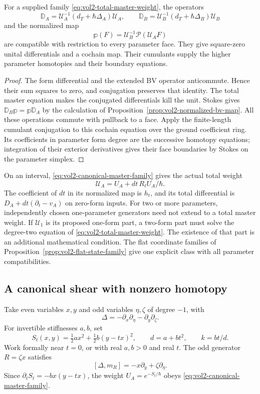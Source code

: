 \begin{proposition}\label{prop:vol2-master-family-faces}
For a supplied family \eqref{eq:vol2-total-master-weight},
the operators
\[
 \mathbb D_A=\mathcal U_A^{-1}(d_T+\hbar\Delta_A)\mathcal U_A,
 \qquad
 \mathbb D_B=\mathcal U_B^{-1}(d_T+\hbar\Delta_B)\mathcal U_B
\]
and the normalized map
\[
 \mathbb p(F)=\mathcal U_B^{-1}\mathcal P(\mathcal U_AF)
\]
are compatible with restriction to every parameter face.
They give square-zero unital differentials and a cochain
map. Their cumulants supply the higher parameter
homotopies and their boundary equations.
\end{proposition}
\begin{proof}
The form differential and the extended BV operator
anticommute. Hence their sum squares to zero, and
conjugation preserves that identity. The total master
equation makes the conjugated differentials kill the unit.
Stokes gives $\mathbb D_B\mathbb p=\mathbb p\mathbb D_A$
by the calculation of
Proposition~\ref{prop:vol2-normalized-bv-map}.
All these operations commute with pullback to a face.
Apply the finite-length cumulant conjugation to this
cochain equation over the ground coefficient ring.
Its coefficients in parameter form degree are the
successive homotopy equations; integration of their
exterior derivatives gives their face boundaries by
Stokes on the parameter simplex.
\end{proof}

On an interval, \eqref{eq:vol2-canonical-master-family}
gives the actual total weight
\[
 \mathcal U_A=U_A+dt\,R_tU_A/\hbar.
\]
The coefficient of $dt$ in its normalized map is $h_t$,
and its total differential is
$D_A+dt(\partial_t-v_A)$ on zero-form inputs.
For two or more parameters, independently chosen
one-parameter generators need not extend to a total
master weight. If $\mathcal U_1$ is its proposed
one-form part, a two-form part must solve the degree-two
equation of \eqref{eq:vol2-total-master-weight}.
The existence of that part is an additional mathematical
condition. The flat coordinate families of
Proposition~\ref{prop:vol2-flat-state-family} give one
explicit class with all parameter compatibilities.

\subsection{A canonical shear with nonzero homotopy}

Take even variables $x,y$ and odd variables $\eta,\zeta$
of degree $-1$, with
\[
 \Delta=-\partial_x\partial_\eta-\partial_y\partial_\zeta.
\]
For invertible stiffnesses $a,b$, set
\begin{equation}\label{eq:vol2-shear-potential}
 S_t(x,y)=\tfrac12ax^2+\tfrac12b(y-tx)^2,
 \qquad d=a+bt^2,
 \qquad k=bt/d.
\end{equation}
Work formally near $t=0$, or with real $a,b>0$ and real
$t$. The odd generator $R=\zeta x$ satisfies
\[
 [\Delta,m_R]=-x\partial_y+\zeta\partial_\eta.
\]
Since $\partial_tS_t=-bx(y-tx)$, the weight
$U_A=e^{-S_t/\hbar}$ obeys
\eqref{eq:vol2-canonical-master-family}.

